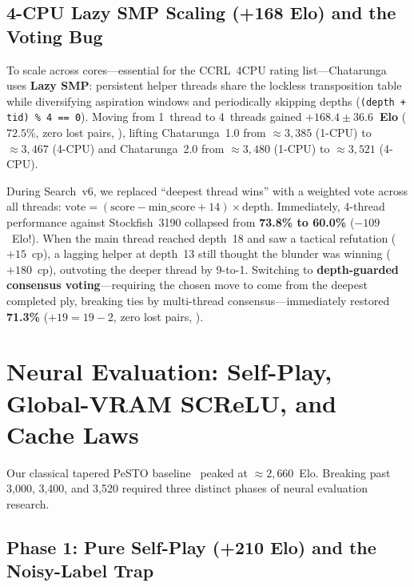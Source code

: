 \documentclass[10.5pt,letterpaper]{article}
\begin{document}
\subsection{4-CPU Lazy SMP Scaling (+168 Elo) and the Voting Bug}

To scale across cores—essential for the CCRL~4CPU rating list—Chatarunga uses \textbf{Lazy SMP}: persistent helper threads share the lockless transposition table while diversifying aspiration windows and periodically skipping depths (\texttt{(depth + tid) \% 4 == 0}). Moving from 1~thread to 4~threads gained \textbf{$+168.4 \pm 36.6$~Elo} ($72.5\%$, zero lost pairs, ), lifting Chatarunga~1.0 from $\approx 3{,}385$ (1-CPU) to $\approx 3{,}467$ (4-CPU) and Chatarunga~2.0 from $\approx 3{,}480$ (1-CPU) to $\approx 3{,}521$ (4-CPU).

\begin{failurebox}
During Search~v6, we replaced ``deepest thread wins'' with a weighted vote across all threads: $\text{vote} = (\text{score} - \text{min\_score} + 14) \times \text{depth}$. Immediately, 4-thread performance against Stockfish~3190 collapsed from \textbf{73.8\% to 60.0\%} ($-109$~Elo!). When the main thread reached depth~18 and saw a tactical refutation ($+15$~cp), a lagging helper at depth~13 still thought the blunder was winning ($+180$~cp), outvoting the deeper thread by 9-to-1. Switching to \textbf{depth-guarded consensus voting}—requiring the chosen move to come from the deepest completed ply, breaking ties by multi-thread consensus—immediately restored \textbf{71.3\%} ($+19 =19 -2$, zero lost pairs, ).
\end{failurebox}

\section{Neural Evaluation: Self-Play, Global-VRAM SCReLU, and Cache Laws}

Our classical tapered PeSTO baseline~\cite{pesto} peaked at $\approx 2{,}660$~Elo. Breaking past 3,000, 3,400, and 3,520 required three distinct phases of neural evaluation research.

\subsection{Phase 1: Pure Self-Play (+210 Elo) and the Noisy-Label Trap}
\end{document}
